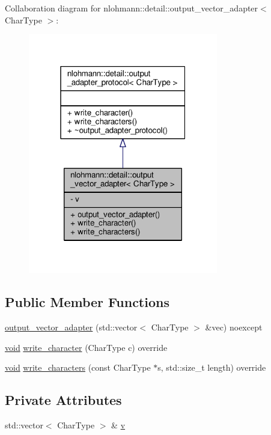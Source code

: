 Collaboration diagram for nlohmann\+:\+:detail\+:\+:output\+\_\+vector\+\_\+adapter$<$ Char\+Type $>$\+:
\nopagebreak
\begin{figure}[H]
\begin{center}
\leavevmode
\includegraphics[width=235pt]{classnlohmann_1_1detail_1_1output__vector__adapter__coll__graph}
\end{center}
\end{figure}
\subsection*{Public Member Functions}
\begin{DoxyCompactItemize}
\item 
\hyperlink{classnlohmann_1_1detail_1_1output__vector__adapter_a9c4fbf88fda356837038ec30a264cd3e}{output\+\_\+vector\+\_\+adapter} (std\+::vector$<$ Char\+Type $>$ \&vec) noexcept
\item 
\hyperlink{namespacenlohmann_1_1detail_a59fca69799f6b9e366710cb9043aa77d}{void} \hyperlink{classnlohmann_1_1detail_1_1output__vector__adapter_af6a22d4210bb7bc2da66021300ddd6db}{write\+\_\+character} (Char\+Type c) override
\item 
\hyperlink{namespacenlohmann_1_1detail_a59fca69799f6b9e366710cb9043aa77d}{void} \hyperlink{classnlohmann_1_1detail_1_1output__vector__adapter_ad6f6c461dec7bedd5359454dc22fc9aa}{write\+\_\+characters} (const Char\+Type $\ast$s, std\+::size\+\_\+t length) override
\end{DoxyCompactItemize}
\subsection*{Private Attributes}
\begin{DoxyCompactItemize}
\item 
std\+::vector$<$ Char\+Type $>$ \& \hyperlink{classnlohmann_1_1detail_1_1output__vector__adapter_a9b1ed9fba14e671ae1abb6692560ef3f}{v}
\end{DoxyCompactItemize}


